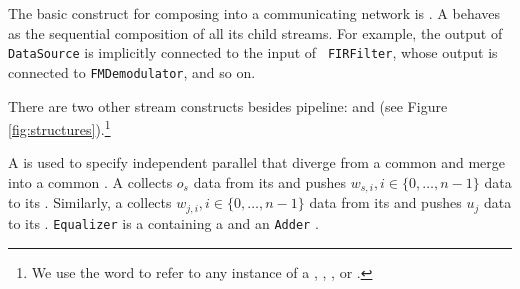 


The basic construct for composing \filters into a communicating
network is {\pipeline}.  A {\pipeline} behaves as the sequential
composition of all its child streams.  For example, the output of
{\tt DataSource} is implicitly connected to the input of {\tt
FIRFilter}, whose output is connected to {\tt FMDemodulator}, and
so on.

There are two other stream constructs besides pipeline:
{\splitjoin} and {\feedbackloop} (see Figure
\ref{fig:structures}).\footnote{We use the word {\stream} to refer
to any instance of a {\filter}, {\pipeline}, {\splitjoin}, or
{\feedbackloop}.}

A {\splitjoin} is used to specify independent parallel {\streams}
that diverge from a common {\splitter} and merge into a common
{\joiner}. A {\splitter} collects $o_s$ data from its {\Input}
{\Channel} and pushes $w_{s,i}, i \in \{0,\dots,n-1\}$ data to its
{\Output} {\Channels}. Similarly, a {\joiner} collects $w_{j,i}, i
\in \{0,\dots,n-1\}$ data from its {\Input} {\Channel} and pushes
$u_j$ data to its {\Output} {\Channel}. {\tt Equalizer} is a
\pipeline containing a \splitjoin and an {\tt Adder} \filter.

